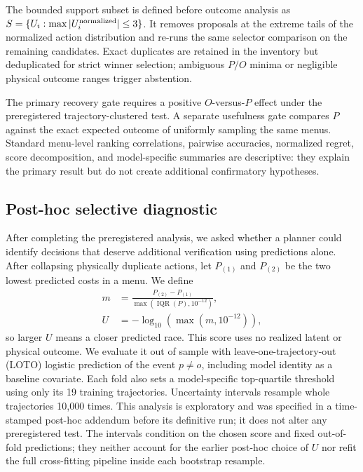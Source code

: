 \documentclass[letterpaper,10pt,conference]{ieeeconf}
\begin{document}
The bounded support subset is defined before outcome analysis as
$S=\{U_i:\max|U_i^{\rm normalized}|\leq3\}$. It removes proposals at the
extreme tails of the normalized action distribution and re-runs the same
selector comparison on the remaining candidates. Exact duplicates are retained
in the inventory but deduplicated for strict winner selection; ambiguous
$P/O$ minima or negligible physical outcome ranges trigger abstention.

The primary recovery gate requires a positive $O$-versus-$P$ effect under the
preregistered trajectory-clustered test. A separate usefulness gate compares
$P$ against the exact expected outcome of uniformly sampling the same menus.
Standard menu-level ranking correlations, pairwise accuracies, normalized
regret, score decomposition, and model-specific summaries are descriptive:
they explain the primary result but do not create additional confirmatory
hypotheses.

\subsection{Post-hoc selective diagnostic}

After completing the preregistered analysis, we asked whether a planner could
identify decisions that deserve additional verification using predictions
alone. After collapsing physically duplicate actions, let $P_{(1)}$ and
$P_{(2)}$ be the two lowest predicted costs in a menu. We define
\begin{equation}
\begin{aligned}
m&=\frac{P_{(2)}-P_{(1)}}
        {\max(\operatorname{IQR}(P),10^{-12})},\\
U&=-\log_{10}\!\left(\max(m,10^{-12})\right),
\end{aligned}
\label{eq:ambiguity}
\end{equation}
so larger $U$ means a closer predicted race. This score uses no realized
latent or physical outcome. We evaluate it out of sample with
leave-one-trajectory-out (LOTO) logistic prediction of the event $p\ne o$,
including model identity as a baseline covariate. Each fold also sets a
model-specific top-quartile threshold using only its 19 training trajectories.
Uncertainty intervals resample whole trajectories 10,000 times. This analysis
is exploratory and was specified in a time-stamped post-hoc addendum before its
definitive run; it does not alter any preregistered test. The intervals condition
on the chosen score and fixed out-of-fold predictions; they neither account for
the earlier post-hoc choice of $U$ nor refit the full cross-fitting pipeline
inside each bootstrap resample.
\end{document}

